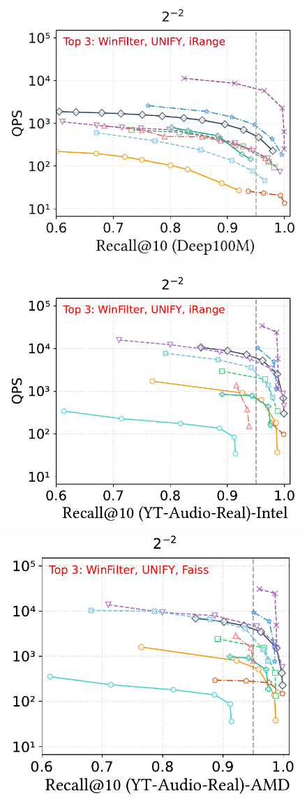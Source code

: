 \documentclass[sigconf, nonacm]{acmart}
\begin{document}
{\begin{figure}
\begin{minipage}[t]{0.36\textwidth}
	\end{minipage}
	\hfill
	\begin{minipage}[t]{0.18\textwidth}
		\centering
		\includegraphics[width=0.96\linewidth]{figures/exp/range_deep100M.pdf} 
	\end{minipage}
	\hfill %
	\begin{minipage}[t]{0.36\textwidth}
		\centering
		\includegraphics[width=0.495\linewidth]{figures/exp/range_85.pdf}
		\hfill
		\includegraphics[width=0.47\linewidth]{figures/exp/range_71.pdf}
	\end{minipage}
\end{figure}

}
\end{document}
